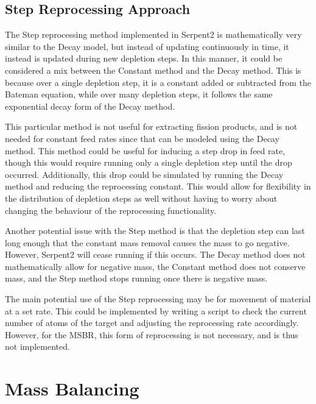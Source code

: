 
\subsection{Step Reprocessing Approach}

The Step reprocessing method implemented in Serpent2 is mathematically very similar to the Decay model, but instead of updating continuously in time, it instead is updated during new depletion steps. In this manner, it could be considered a mix between the Constant method and the Decay method. This is because over a single depletion step, it is a constant added or subtracted from the Bateman equation, while over many depletion steps, it follows the same exponential decay form of the Decay method.

This particular method is not useful for extracting fission products, and is not needed for constant feed rates since that can be modeled using the Decay method. This method could be useful for inducing a step drop in feed rate, though this would require running only a single depletion step until the drop occurred. Additionally, this drop could be simulated by running the Decay method and reducing the reprocessing constant. This would allow for flexibility in the distribution of depletion steps as well without having to worry about changing the behaviour of the reprocessing functionality. 

Another potential issue with the Step method is that the depletion step can last long enough that the constant mass removal causes the mass to go negative. However, Serpent2 will cease running if this occurs. The Decay method does not mathematically allow for negative mass, the Constant method does not conserve mass, and the Step method stops running once there is negative mass.

The main potential use of the Step reprocessing may be for movement of material at a set rate. This could be implemented by writing a script to check the current number of atoms of the target and adjusting the reprocessing rate accordingly. However, for the MSBR, this form of reprocessing is not necessary, and is thus not implemented.

\section{Mass Balancing}
\label{s:mass-bal-meth}

